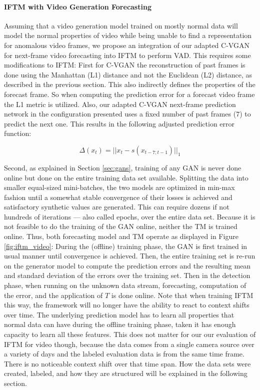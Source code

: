 \paragraph{IFTM with Video Generation Forecasting}
Assuming that a video generation model trained on mostly normal data will model the normal properties of video while being unable to find a representation for anomalous video frames, we propose an integration of our adapted C-VGAN for next-frame video forecasting into IFTM to perform VAD. This requires some modifications to IFTM: First for C-VGAN the reconstruction of past frames is done using the Manhattan (L1) distance and not the Euclidean (L2) distance, as described in the previous section. This also indirectly defines the properties of the forecast frame. So when computing the prediction error for a forecast video frame the L1 metric is utilized. Also, our adapted C-VGAN next-frame prediction network in the configuration presented uses a fixed number of past frames ($7$) to predict the next one. This results in the following adjusted prediction error function:

\begin{equation} \label{eq:forc_2}
\Delta(x_{t}) = ||x_{t}-s(x_{t-7;t-1})||_1
\end{equation}

Second, as explained in Section \ref{sec:gans}, training of any GAN is never done online but done on the entire training data set available. Splitting the data into smaller equal-sized mini-batches, the two models are optimized in min-max fashion until a somewhat stable convergence of their losses is achieved and satisfactory synthetic values are generated. This can require dozens if not hundreds of iterations --- also called epochs, over the entire data set. Because it is not feasible to do the training of the GAN online, neither the TM is trained online. Thus, both forecasting model and TM operate as displayed in Figure \ref{fig:iftm_video}: During the (offline) training phase, the GAN is first trained in usual manner until convergence is achieved. Then, the entire training set is re-run on the generator model to compute the prediction errors and the resulting mean and standard deviation of the errors over the training set. Then in the detection phase, when running on the unknown data stream, forecasting, computation of the error, and the application of $T$ is done online. Note that when training IFTM this way, the framework will no longer have the ability to react to context shifts over time. The underlying prediction model has to learn all properties that normal data can have during the offline training phase, taken it has enough capacity to learn all these features. This does not matter for our our evaluation of IFTM for video though, because the data comes from a single camera source over a variety of days and the labeled evaluation data is from the same time frame. There is no noticeable context shift over that time span. How the data sets were created, labeled, and how they are structured will be explained in the following section.



